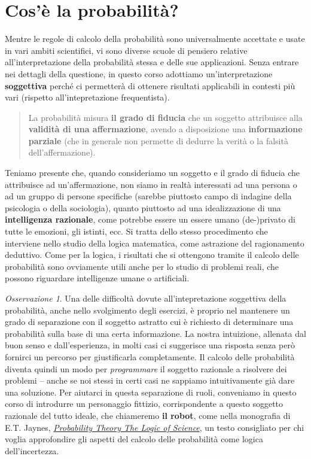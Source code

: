 \documentclass[
  italian,
  letterpaper,
]{book}
\theoremstyle{definition}
\theoremstyle{remark}
\newtheorem*{remark}{Osservazione}
\begin{document}
\section{Cos'è la probabilità?}\label{sec-intuitivo}

Mentre le regole di calcolo della probabilità sono universalmente
accettate e usate in vari ambiti scientifici, vi sono diverse scuole di
pensiero relative all'interpretazione della probabilità stessa e delle
sue applicazioni. Senza entrare nei dettagli della questione, in questo
corso adottiamo un'interpretazione \textbf{soggettiva} perché ci
permetterà di ottenere risultati applicabili in contesti più vari
(rispetto all'intepretazione frequentista).

\begin{quote}
La probabilità misura \textbf{il grado di fiducia} che un soggetto
attribuisce alla \textbf{validità di una affermazione}, avendo a
disposizione una \textbf{informazione parziale} (che in generale non
permette di dedurre la verità o la falsità dell'affermazione).
\end{quote}

Teniamo presente che, quando consideriamo un soggetto e il grado di
fiducia che attribuisce ad un'affermazione, non siamo in realtà
interessati ad una persona o ad un gruppo di persone specifiche (sarebbe
piuttosto campo di indagine della psicologia o della sociologia), quanto
piuttosto ad una idealizzazione di una \textbf{intelligenza razionale},
come potrebbe essere un essere umano (de-)privato di tutte le emozioni,
gli istinti, ecc. Si tratta dello stesso procedimento che interviene
nello studio della logica matematica, come astrazione del ragionamento
deduttivo. Come per la logica, i risultati che si ottengono tramite il
calcolo delle probabilità sono ovviamente utili anche per lo studio di
problemi reali, che possono riguardare intelligenze umane o artificiali.

\begin{remark}
Una delle difficoltà dovute all'intepretazione soggettiva della
probabilità, anche nello svolgimento degli esercizi, è proprio nel
mantenere un grado di separazione con il soggetto astratto cui è
richiesto di determinare una probabilità sulla base di una certa
informazione. La nostra intuizione, allenata dal buon senso e
dall'esperienza, in molti casi ci suggerisce una risposta senza però
fornirci un percorso per giustificarla completamente. Il calcolo delle
probabilità diventa quindi un modo per \emph{programmare} il soggetto
razionale a risolvere dei problemi -- anche se noi stessi in certi casi
ne sappiamo intuitivamente già dare una soluzione. Per aiutarci in
questa separazione di ruoli, conveniamo in questo corso di introdurre un
personaggio fittizio, corrispondente a questo soggetto razionale del
tutto ideale, che chiameremo \textbf{il robot}, come nella monografia di
E.T. Jaynes,
\href{https://www.cambridge.org/core/books/probability-theory/9CA08E224FF30123304E6D8935CF1A99}{\emph{Probability
Theory The Logic of Science}}, un testo consigliato per chi voglia
approfondire gli aspetti del calcolo delle probabilità come logica
dell'incertezza.
\end{remark}
\end{document}
